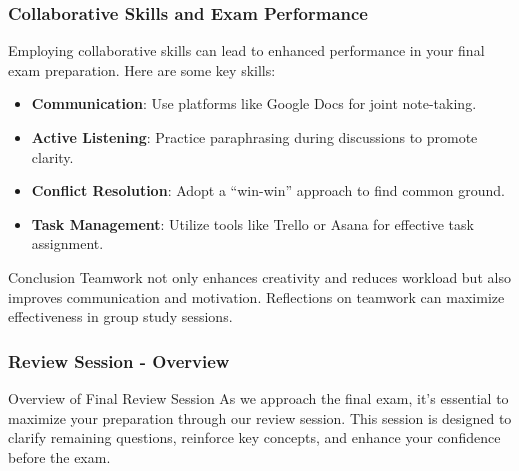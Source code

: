 \documentclass{beamer}
\begin{document}
\begin{frame}[fragile]
    \frametitle{Collaborative Skills and Exam Performance}
    Employing collaborative skills can lead to enhanced performance in your final exam preparation. Here are some key skills:

    \begin{itemize}
        \item \textbf{Communication}: Use platforms like Google Docs for joint note-taking.
        \item \textbf{Active Listening}: Practice paraphrasing during discussions to promote clarity.
        \item \textbf{Conflict Resolution}: Adopt a “win-win” approach to find common ground.
        \item \textbf{Task Management}: Utilize tools like Trello or Asana for effective task assignment.
    \end{itemize}

    \begin{block}{Conclusion}
        Teamwork not only enhances creativity and reduces workload but also improves communication and motivation. Reflections on teamwork can maximize effectiveness in group study sessions.
    \end{block}
\end{frame}

\begin{frame}[fragile]
    \frametitle{Review Session - Overview}
    \begin{block}{Overview of Final Review Session}
        As we approach the final exam, it's essential to maximize your preparation through our review session. 
        This session is designed to clarify remaining questions, reinforce key concepts, and enhance your confidence before the exam.
    \end{block}
\end{frame}
\end{document}
